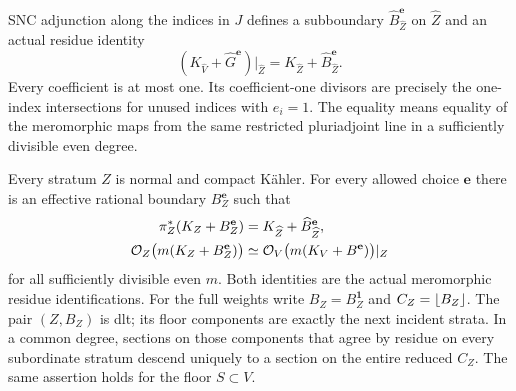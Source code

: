 SNC adjunction along the indices in \(J\) defines a subboundary
\(\widehat B_{\widehat Z}^{\mathbf e}\) on \(\widehat Z\) and an actual
residue identity
\begin{equation}\label{eq:snc-stratum-adjunction}
 (K_{\widehat V}+\widehat G^{\mathbf e})|_{\widehat Z}
 =K_{\widehat Z}+\widehat B_{\widehat Z}^{\mathbf e}.
\end{equation}
Every coefficient is at most one.  Its coefficient-one divisors are
precisely the one-index intersections for unused indices with \(e_i=1\).
The equality means equality of the meromorphic maps from the same
restricted pluriadjoint line in a sufficiently divisible even degree.

\begin{proposition}\label{prop:strata-adjunction}
Every stratum \(Z\) is normal and compact K\"ahler.  For every allowed
choice \(\mathbf e\) there is an effective rational boundary
\(B_Z^{\mathbf e}\) such that
\begin{align}
 \pi_Z^*(K_Z+B_Z^{\mathbf e})
   &=K_{\widehat Z}+\widehat B_{\widehat Z}^{\mathbf e},
       \label{eq:stratum-crepant}\\
 \mathcal O_Z\bigl(m(K_Z+B_Z^{\mathbf e})\bigr)
   &\simeq\mathcal O_V\bigl(m(K_V+B^{\mathbf e})\bigr)|_Z
       \label{eq:stratum-line}
\end{align}
for all sufficiently divisible even \(m\).  Both identities are the
actual meromorphic residue identifications.  For the full weights write
\(B_Z=B_Z^{\mathbf 1}\) and \(C_Z=\left\lfloor B_Z\right\rfloor\).  The pair \((Z,B_Z)\)
is dlt; its floor components are exactly the next incident strata.
In a common degree, sections on those components that agree by residue
on every subordinate stratum descend uniquely to a section on the entire
reduced \(C_Z\).  The same assertion holds for the floor \(S\subset V\).
\end{proposition}
